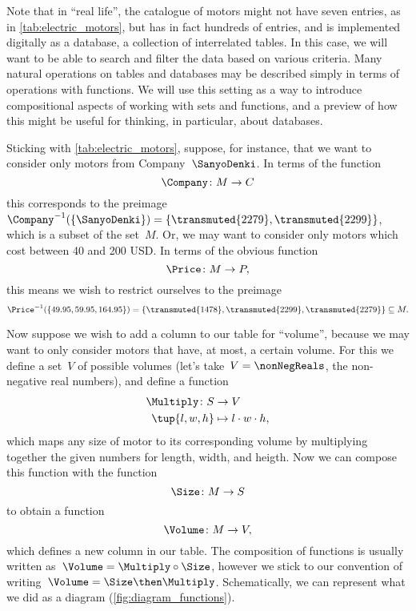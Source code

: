Note that in ``real life'', the catalogue of motors might not have seven entries, as in \cref{tab:electric_motors}, but has in fact hundreds of entries, and is implemented digitally as a database,  a collection of interrelated tables. In this case, we will want to be able to search and filter the data based on various criteria. Many natural operations on tables and databases may be described simply in terms of operations with functions. We will use this setting as a way to introduce compositional aspects of working with sets and functions, and a preview of how this might be useful for thinking, in particular, about databases.

Sticking with \cref{tab:electric_motors}, suppose, for instance, that we want to consider only motors from Company~$\SanyoDenki$. In terms of the function
\begin{equation*}
    \Company\colon M \to C
\end{equation*}
this corresponds to the preimage~$\Company^{-1}(\{\SanyoDenki \}) = \{ \transmuted{2279}, \transmuted{2299}\}$, which is a subset of the set~$M$. Or, we may want to consider only motors which cost between 40 and 200 USD. In terms of the obvious function
\begin{equation*}
   \Price\colon M \to P,
\end{equation*}
this means we wish to restrict ourselves to the preimage
\begin{equation*}
   \Price^{-1}(\{ 49.95, 59.95, 164.95\}) = \{ \transmuted{1478}, \transmuted{2299}, \transmuted{2279} \} \subseteq M.
\end{equation*}

Now suppose we wish to add a column to our table for ``volume'', because we may want to only consider motors that have, at most, a certain volume.
For this we define a set~$V$ of possible volumes (let's take~$V = \nonNegReals$, the non-negative real numbers), and define a function
\begin{equation*}
    \begin{aligned}
        \Multiply \colon S &\to V\\
        \tup{l, w, h} &\mapsto l \cdot w \cdot h,
    \end{aligned}
\end{equation*}
which maps any size of motor to its corresponding volume by multiplying together the given numbers for length, width, and heigth. Now we can compose this function with the function
\begin{equation*}
    \Size \colon M \to S
\end{equation*}
to obtain a function
\begin{equation*}
    \Volume\colon M \to V,
\end{equation*}
which defines a new column in our table. The composition of functions is usually written as~$\Volume = \Multiply  \circ \Size $, however we stick to our convention of writing~$\Volume = \Size  \then \Multiply $. Schematically, we can represent what we did as a diagram (\cref{fig:diagram_functions}).

